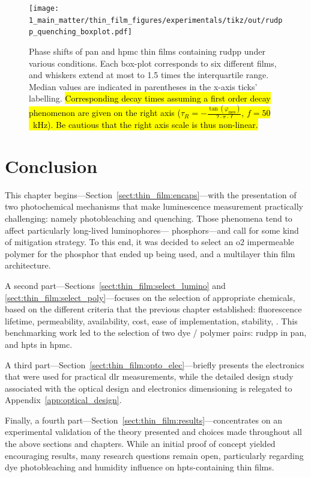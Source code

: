 \begin{figure}
	\centering
	\texttt{[image: 1\_main\_matter/thin\_film\_figures/experimentals/tikz/out/rudpp\_quenching\_boxplot.pdf]}
	\caption[Box-plot of \gls{rudpp} phosphorescence quenching in different conditions.]{Phase shifts of \gls{pan} and \gls{hpmc} thin films containing \gls{rudpp} under various conditions. Each box-plot corresponds to six different films, and whiskers extend at most to 1.5 times the interquartile range. Median values are indicated in parentheses in the x-axis ticks' labelling. \hl{Corresponding decay times assuming a first order decay phenomenon are given on the right axis ($\tau_\textit{R}=-\frac{\tan(\varphi_\text{mes})}{2\cdot\pi\cdot f}$, $f=50$~kHz). Be cautious that the right axis scale is thus non-linear.}}
	\label{fig:thin_film:experimental:rudpp_quenching_boxplot}
\end{figure}

\section{Conclusion}\label{sect:thin_film:conclusion}

This chapter begins---Section~\ref{sect:thin_film:encaps}---with the presentation of two photochemical mechanisms that make luminescence measurement practically challenging: namely photobleaching and quenching. Those phenomena tend to affect particularly long-lived luminophores---\ie{} phosphors---and call for some kind of mitigation strategy. To this end, it was decided to select an \gls{o2} impermeable polymer for the phosphor that ended up being used, and a multilayer thin film architecture.

A second part---Sections~\ref{sect:thin_film:select_lumino} and \ref{sect:thin_film:select_poly}---focuses on the selection of appropriate chemicals, based on the different criteria that the previous chapter established: fluorescence lifetime, permeability, availability, cost, ease of implementation, stability, \etc{}. This benchmarking work led to the selection of two dye / polymer pairs: \gls{rudpp} in \gls{pan}, and \gls{hpts} in \gls{hpmc}.

A third part---Section~\ref{sect:thin_film:opto_elec}---briefly presents the electronics that were used for practical \gls{dlr} measurements, while the detailed design study associated with the optical design and electronics dimensioning is relegated to Appendix~\ref{app:optical_design}.

Finally, a fourth part---Section~\ref{sect:thin_film:results}---concentrates on an experimental validation of the theory presented and choices made throughout all the above sections and chapters. While an initial proof of concept yielded encouraging results, many research questions remain open, particularly regarding dye photobleaching and humidity influence on \gls{hpts}-containing thin films.

